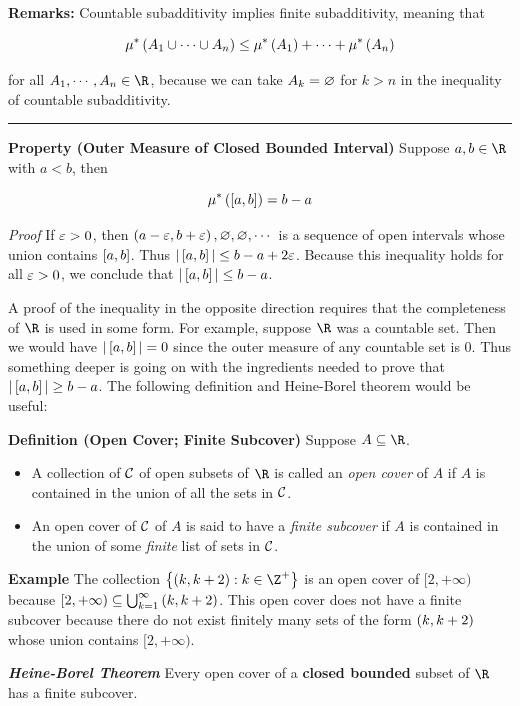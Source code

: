 \documentclass[
]{article}
\begin{document}
\textbf{Remarks:} Countable subadditivity implies finite subadditivity,
meaning that

\[\mu^*\left(A_1\cup\cdots\cup A_n\right)\le \mu^*\left(A_1\right)+\cdots +\mu^*\left(A_n\right)\]

for all \(A_1,\cdots ,A_n\in \R\), because we can take \(A_k = \varnothing\)
for \(k>n\) in the inequality of countable subadditivity.

\begin{center}\rule{0.5\linewidth}{0.5pt}\end{center}

\textbf{Property (Outer Measure of Closed Bounded Interval)} Suppose
\(a,b\in \R\) with \(a<b\), then

\[\mu^*\left(\left[a,b\right]\right) = b-a\]

\emph{Proof} If \(\varepsilon>0\), then
\(\left(a-\varepsilon,b+\varepsilon\right),\varnothing,\varnothing,\cdots\) is a sequence of open
intervals whose union contains \(\left[a,b\right]\). Thus
\(|\left[a,b\right]|\le b-a+2\varepsilon\). Because this inequality holds for all
\(\varepsilon>0\), we conclude that \(|\left[a,b\right]|\le b-a\).

A proof of the inequality in the opposite direction requires that the
completeness of \(\R\) is used in some form. For example, suppose \(\R\)
was a countable set. Then we would have \(|\left[a,b\right]| = 0\) since the
outer measure of any countable set is \(0\). Thus something deeper is
going on with the ingredients needed to prove that
\(|\left[a,b\right]|\ge b-a\). The following definition and Heine-Borel theorem
would be useful:

\textbf{Definition (Open Cover; Finite Subcover)} Suppose \(A\se \R\).

\begin{itemize}
\item
  A collection of \(\mathcal C\) of open subsets of \(\R\) is called an
  \emph{open cover} of \(A\) if \(A\) is contained in the union of all
  the sets in \(\mathcal C\).
\item
  An open cover of \(\mathcal C\) of \(A\) is said to have a \emph{finite
  subcover} if \(A\) is contained in the union of some \emph{finite}
  list of sets in \(\mathcal C\).
\end{itemize}

\textbf{Example} The collection \(\brace{\pr{k,k+2}:k\in \Z^+}\) is an
open cover of \([2,+\infty)\) because
\([2,+\infty)\subseteq \bigcup_{k = 1}^{\infty}\left(k,k+2\right)\). This open
cover does not have a finite subcover because there do not exist
finitely many sets of the form \(\left(k,k+2\right)\) whose union contains
\([2,+\infty)\).

\emph{\textbf{Heine-Borel Theorem}} Every open cover of a \textbf{closed
bounded} subset of \(\R\) has a finite subcover.
\end{document}
